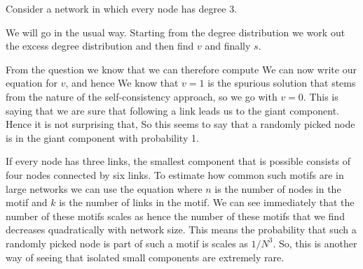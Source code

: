 Consider a network in which every node has degree 3. 

\solution
We will go in the usual way. Starting from the degree distribution we work out the excess degree distribution and then find $v$ and finally $s$.  

From the question we know that 
we can therefore compute 
We can now write our equation for $v$,
and hence 
We know that $v=1$ is the spurious solution that stems from the nature of the self-consistency approach, so we go with $v=0$. This is saying that we are sure that following a link leads us to the giant component.  Hence it is not surprising that,
So this seems to say that a randomly picked node is in the giant component with probability 1. 


\solution
If every node has three links, the smallest component that is possible consists of four nodes connected by six links. To estimate how common such motifs are in large networks we can use the equation
where $n$ is the number of nodes in the motif and $k$ is the number of links in the motif. We can see immediately that the number of these motifs scales as 
hence the number of these motifs that we find decreases quadratically with network size. This means the probability that such a randomly picked node is part of such a motif is scales as $1/N^3$. So, this is another way of seeing that isolated small components are extremely rare.  